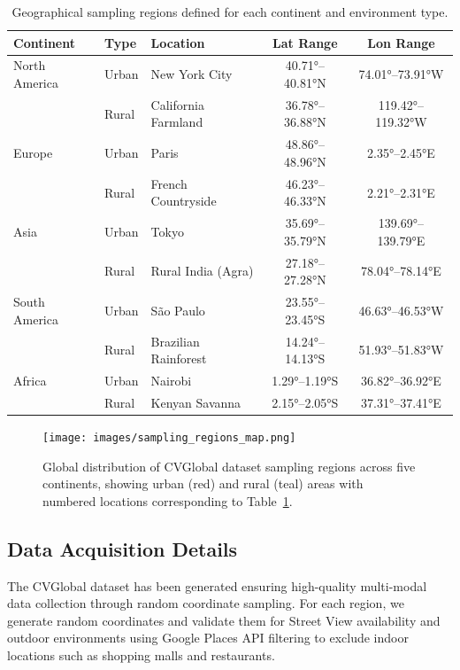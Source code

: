 \documentclass{bmvc2k}
\begin{document}
\begin{table}[t]
\centering
\caption{Geographical sampling regions defined for each continent and environment type.}
\label{tab:sampling_regions}
\begin{tabular}{lllcc}
\toprule
\textbf{Continent} & \textbf{Type} & \textbf{Location} & \textbf{Lat Range} & \textbf{Lon Range} \\
\midrule
North America & Urban & New York City & 40.71°--40.81°N & 74.01°--73.91°W \\
              & Rural & California Farmland & 36.78°--36.88°N & 119.42°--119.32°W \\
\midrule
Europe & Urban & Paris & 48.86°--48.96°N & 2.35°--2.45°E \\
       & Rural & French Countryside & 46.23°--46.33°N & 2.21°--2.31°E \\
\midrule
Asia & Urban & Tokyo & 35.69°--35.79°N & 139.69°--139.79°E \\
     & Rural & Rural India (Agra) & 27.18°--27.28°N & 78.04°--78.14°E \\
\midrule
South America & Urban & São Paulo & 23.55°--23.45°S & 46.63°--46.53°W \\
              & Rural & Brazilian Rainforest & 14.24°--14.13°S & 51.93°--51.83°W \\
\midrule
Africa & Urban & Nairobi & 1.29°--1.19°S & 36.82°--36.92°E \\
       & Rural & Kenyan Savanna & 2.15°--2.05°S & 37.31°--37.41°E \\
\bottomrule
\end{tabular}
\end{table}

\begin{figure}[t]
    \centering
    \texttt{[image: images/sampling\_regions\_map.png]}
    \caption{Global distribution of CVGlobal dataset sampling regions across five continents, showing urban (red) and rural (teal) areas with numbered locations corresponding to Table~\ref{tab:sampling_regions}.}
    \label{fig:sampling_regions}
\end{figure}

\subsection{Data Acquisition Details}

The CVGlobal dataset has been generated ensuring high-quality multi-modal data collection through random coordinate sampling. For each region, we generate random coordinates and validate them for Street View availability and outdoor environments using Google Places API filtering to exclude indoor locations such as shopping malls and restaurants.
\end{document}
